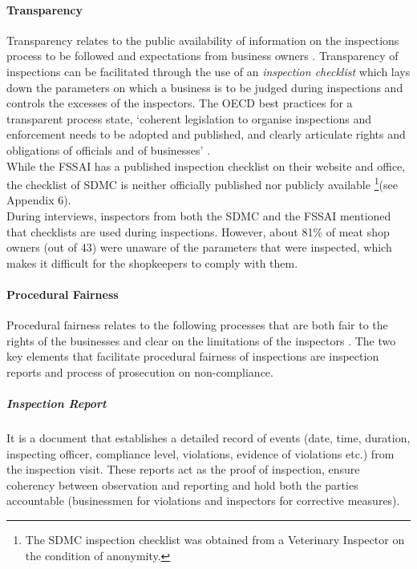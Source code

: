\documentclass[a4paper, 12pt]{article}
\begin{document}
\paragraph{Transparency}

Transparency relates to the public availability of information on the inspections process to be followed and expectations from business owners \parencite{blancreport}. Transparency of inspections can be facilitated through the use of an \textit {inspection checklist} which lays down the parameters on which a business is to be judged during inspections and controls the excesses of the inspectors. The OECD best practices for a transparent process state, ‘coherent legislation to organise inspections and enforcement needs to be adopted and published, and clearly articulate rights and obligations of officials and of businesses’ \parencite{oecd1report}.\\

While the FSSAI has a published inspection checklist on their website and office, the checklist of SDMC is neither officially published nor publicly available \footnote{ The SDMC inspection checklist was obtained from a Veterinary Inspector on the condition of anonymity.}(see Appendix 6). \\

During interviews, inspectors from both the SDMC and the FSSAI mentioned that checklists are used during inspections. However, about 81\% of meat shop owners (out of 43) were unaware of the parameters that were inspected, which makes it difficult for the shopkeepers to comply with them. 

\paragraph{Procedural Fairness}

Procedural fairness relates to the following processes that are both fair to the rights of the businesses and clear on the limitations of the inspectors \parencite{oecdreport}. The two key elements that facilitate procedural fairness of inspections are inspection reports and process of prosecution on non-compliance.

\subparagraph{Inspection Report}

It is a document that establishes a detailed record of events (date, time, duration, inspecting officer, compliance level, violations, evidence of violations etc.) from the inspection visit. These reports act as the proof of inspection, ensure coherency between observation and reporting and hold both the parties accountable (businessmen for violations and inspectors for corrective measures). \\
\end{document}

